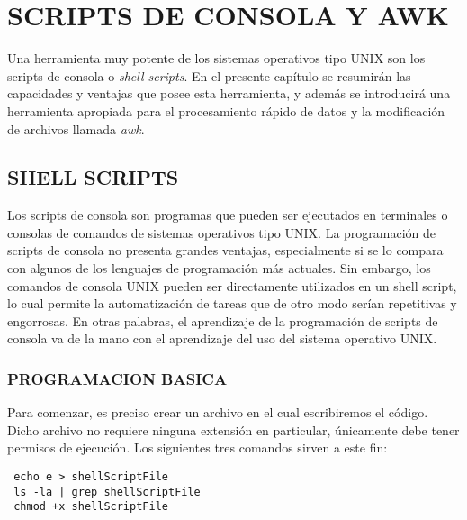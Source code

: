 
\chapter{SCRIPTS DE CONSOLA Y AWK} %

\label{AC} %


Una herramienta muy potente de los sistemas operativos tipo UNIX son los scripts de consola o \textit{shell scripts}. En el presente
capítulo se resumirán las capacidades y ventajas que posee esta herramienta, y además se introducirá una herramienta apropiada para
el procesamiento rápido de datos y la modificación de archivos llamada \textit{awk}.

\section{SHELL SCRIPTS}

Los scripts de consola son programas que pueden ser ejecutados en terminales o consolas de comandos de sistemas operativos tipo UNIX.
La programación de scripts de consola no presenta grandes ventajas, especialmente si se lo compara con algunos de los lenguajes de programación
más actuales. Sin embargo, los comandos de consola UNIX pueden ser directamente utilizados en un shell script, lo cual permite la automatización
de tareas que de otro modo serían repetitivas y engorrosas. En otras palabras, el aprendizaje de la programación de scripts de consola va de la mano con el aprendizaje del uso del sistema operativo UNIX.

\subsection{PROGRAMACION BASICA}

Para comenzar, es preciso crear un archivo en el cual escribiremos el código. Dicho archivo no requiere ninguna extensión en particular,
únicamente debe tener permisos de ejecución. Los siguientes tres comandos sirven a este fin:
\begin{lstlisting}
 echo e > shellScriptFile
 ls -la | grep shellScriptFile
 chmod +x shellScriptFile
\end{lstlisting}


